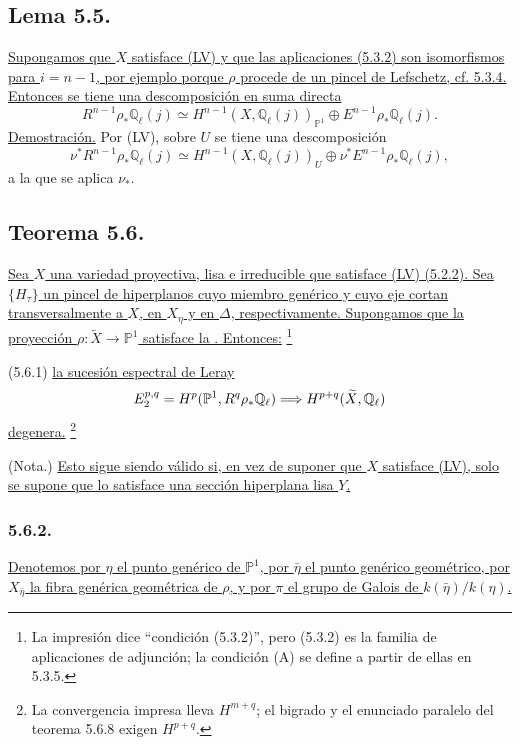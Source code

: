 \subsection*{Lema 5.5.}
\underline{Supongamos que $X$ satisface (LV) y que las aplicaciones
(5.3.2) son isomorfismos para $i=n-1$, por ejemplo porque $\rho$
procede de un pincel de Lefschetz, cf. 5.3.4. Entonces se tiene una
descomposición en suma directa}
\begin{equation}\tag{5.5.1}
R^{n-1}\rho_*\mathbb Q_\ell(j)
\simeq
H^{n-1}(X,\mathbb Q_\ell(j))_{\mathbb P^1}
\oplus E^{n-1}\rho_*\mathbb Q_\ell(j).
\end{equation}
\noindent\underline{Demostración.}
Por (LV), sobre $U$ se tiene una descomposición
\begin{equation}\tag{5.5.2}
\nu^*R^{n-1}\rho_*\mathbb Q_\ell(j)
\simeq
H^{n-1}(X,\mathbb Q_\ell(j))_U
\oplus \nu^*E^{n-1}\rho_*\mathbb Q_\ell(j),
\end{equation}
a la que se aplica $\nu_*$.

\subsection*{Teorema 5.6.}
\underline{Sea $X$ una variedad proyectiva, lisa e irreducible que
satisface (LV) (5.2.2). Sea $\{H_\tau\}$ un pincel de hiperplanos cuyo
miembro genérico y cuyo eje cortan transversalmente a $X$, en $X_\eta$
y en $\Delta$, respectivamente. Supongamos que la proyección
$\rho:\widetilde X\to\mathbb P^1$ satisface la
. Entonces:}
\footnote{La impresión dice ``condición (5.3.2)'', pero (5.3.2) es la
familia de aplicaciones de adjunción; la condición (A) se define a
partir de ellas en 5.3.5.}

\smallskip
\noindent
\textup{(5.6.1)}\quad
\underline{la sucesión espectral de Leray}
\[
E_2^{p,q}=H^p(\mathbb P^1,R^q\rho_*\mathbb Q_\ell)
\Longrightarrow H^{\sisi{m+q}{p+q}}(\widetilde X,\mathbb Q_\ell)
\]
\underline{degenera.}
\footnote{La convergencia impresa lleva $H^{m+q}$; el bigrado y el
enunciado paralelo del teorema 5.6.8 exigen $H^{p+q}$.}

\noindent
\textup{(Nota.)}\quad
\underline{Esto sigue siendo válido si, en vez de suponer que $X$
satisface (LV), solo se supone que lo satisface una sección hiperplana
lisa $Y$.}

\pageoriginale

\subsubsection*{5.6.2.}
\underline{Denotemos por $\eta$ el punto genérico de $\mathbb P^1$,
por $\bar\eta$ el punto genérico geométrico, por $X_{\bar\eta}$ la fibra
genérica geométrica de $\rho$, y por $\pi$ el grupo de Galois de
$k(\bar\eta)/k(\eta)$.}

